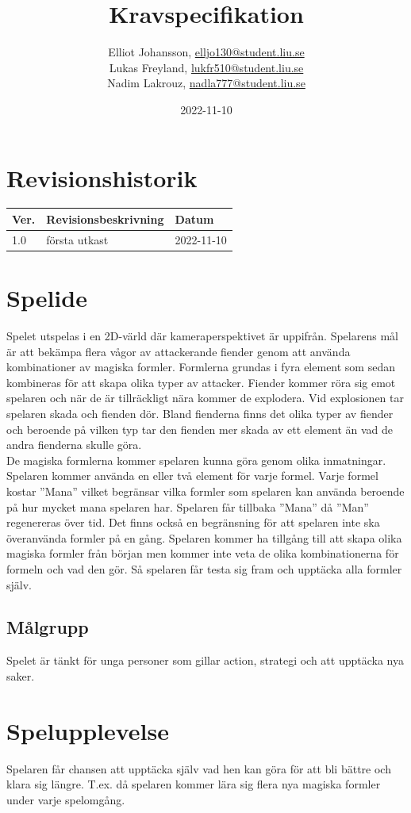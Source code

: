 \documentclass[12pt]{TDP005mall}
\author{Elliot Johansson, \url{elljo130@student.liu.se}\\
  Lukas Freyland, \url{lukfr510@student.liu.se}\\
  Nadim Lakrouz, \url{nadla777@student.liu.se}}
\title{Kravspecifikation}
\date{2022-11-10}
\begin{document}
\projectpage
\section{Revisionshistorik}
\begin{table}[!h]
\begin{tabularx}{\linewidth}{|l|X|l|}
\hline
Ver. & Revisionsbeskrivning & Datum \\\hline
1.0 & första utkast & 2022-11-10 \\\hline
\end{tabularx}
\end{table}


\section{Spelide}

Spelet utspelas i en 2D-värld där kameraperspektivet är uppifrån. Spelarens mål är att bekämpa flera vågor av attackerande fiender genom att använda kombinationer av magiska formler. Formlerna grundas i fyra element som sedan kombineras för att skapa olika typer av attacker. Fiender kommer röra sig emot spelaren och när de är tillräckligt nära kommer de explodera. Vid explosionen tar spelaren skada och fienden dör. Bland fienderna finns det olika typer av fiender och beroende på vilken typ tar den fienden mer skada av ett element än vad de andra fienderna skulle göra.\\
De magiska formlerna kommer spelaren kunna göra genom olika inmatningar. Spelaren kommer använda en eller två element för varje formel. Varje formel kostar ''Mana'' vilket begränsar vilka formler som spelaren kan använda beroende på hur mycket mana spelaren har. Spelaren får tillbaka ''Mana'' då ''Man'' regenereras över tid. Det finns också en begränsning för att spelaren inte ska överanvända formler på en gång.
Spelaren kommer ha tillgång till att skapa olika magiska formler från början men kommer inte veta de olika kombinationerna för formeln och vad den gör. Så spelaren får testa sig fram och upptäcka alla formler själv. 


\subsection{Målgrupp}
Spelet är tänkt för unga personer som gillar action, strategi och att upptäcka nya saker.

\section{Spelupplevelse}
Spelaren får chansen att upptäcka själv vad hen kan göra för att bli bättre och klara sig längre. T.ex. då spelaren kommer lära sig flera nya magiska formler under varje spelomgång. 
\end{document}
